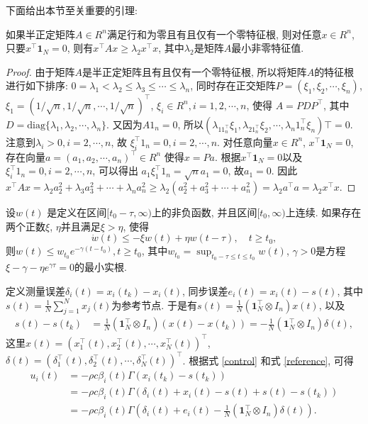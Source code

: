     下面给出本节至关重要的引理:
        \begin{lem}\label{mainlemma}
            如果半正定矩阵$A\in R^n$满足行和为零且有且仅有一个零特征根, 则对任意$x\in  R^n$, 只要$x^\top\mathbf{1}_N=0$, 则有$x^\top A x\geq\lambda_2x^\top x$, 其中$\lambda_2$是矩阵$A$最小非零特征值.
        \end{lem}
        \begin{proof}
        由于矩阵$A$是半正定矩阵且有且仅有一个零特征根, 所以将矩阵$A$的特征根进行如下排序: $0=\lambda_1<\lambda_2\leq\lambda_3\leq\cdots\leq\lambda_n$, 同时存在正交矩阵$P=(\xi_1,\xi_2,\cdots,\xi_n)$, $\xi_1=(1/\sqrt{n},1/\sqrt{n},\cdots,1/\sqrt{n})^\top$, $\xi_i\in R^n, i=1,2,\cdots,n$, 使得
        $A=PDP^\top$, 其中$D=\text{diag}\{\lambda_1,\lambda_2,\cdots,\lambda_n\}$. 又因为$A1_n=0$, 所以$(\lambda_11_n^\top\xi_1,\lambda_21_n^\top\xi_2,\cdots,\lambda_n1_n^\top\xi_n)\top=0$. 注意到$\lambda_i>0, i=2,\cdots,n$, 故 $\xi_i^\top1_n=0, i=2,\cdots,n$. 对任意向量$x\in  R^n$, $x^\top\mathbf{1}_N=0$, 存在向量$a=(a_1,a_2,\cdots,a_n)^\top\in R^n$ 使得$ x=Pa$. 根据$x^\top\mathbf{1}_N=0$以及$\xi_i^\top1_n=0, i=2,\cdots,n$, 可以得出 $a_1\xi_1^\top1_n=\sqrt{n}a_1=0$, 故$a_1=0$. 因此$x^\top A x=\lambda_2a_2^2+\lambda_3a_3^2+\cdots+\lambda_na_n^2\geq\lambda_2(a_2^2+a_3^2+\cdots+a_n^2)=\lambda_2a^\top a=\lambda_2x^\top x$.
        \end{proof}
        \begin{lem}[Halanay不等式]{\rm{}}\label{Halanay}
            设$w(t)$ 是定义在区间$[t_0-\tau, \infty)$上的非负函数, 并且区间$[t_0, \infty)$上连续.
            如果存在两个正数$\xi$, $\eta$并且满足$\xi>\eta$, 使得
            $$\dot{w}(t)\leq -\xi w(t)+\eta w(t-\tau),\quad t\geq t_0,$$
            则$w(t)\leq w_{t_0}e^{-\gamma(t-t_0)}, t\geq t_0$,
            其中$w_{t_0}=\sup_{t_0-\tau\leq t\leq t_0}w(t)$, $\gamma>0$是方程$\xi-\gamma-\eta e^{\gamma\tau}=0$的最小实根.
        \end{lem}
        定义测量误差$\delta_i(t)=x_i(t_k)-x_i(t)$, 同步误差$e_{i}(t)=x_{i}(t)-s(t)$, 其中$s(t)=\frac{1}{N}\sum_{j=1}^Nx_j(t)$为参考节点.
        于是有${s}(t)=\frac{1}{N}(\mathbf{1}^\top_N\otimes I_n)x(t)$, 以及
        \begin{align}\label{reference}
        s(t)-s(t_k)&=\frac{1}{N}(\mathbf{1}^\top_N\otimes I_n)(x(t)-x(t_k))
        =-\frac{1}{N}(\mathbf{1}_N^\top\otimes I_n)\delta(t),
        \end{align}
        这里$x(t)=(x^\top_1(t),x^\top_2(t),\cdots,x^\top_N(t))^\top$, ${\delta}(t)=({\delta}^\top_1(t),{\delta}^\top_2(t),\cdots,{\delta}^\top_N(t))^\top$. 根据式 \eqref{control} 和式 \eqref{reference}, 可得
        \begin{align*}
        {u}_i(t)&=-\rho c\beta_i(t)\Gamma(x_i(t_k)-s(t_k))\\
        &=-\rho c\beta_i(t)\Gamma({\delta}_i(t)+x_i(t)-{s}(t)+{s}(t)-{s}(t_k))\\
        &=-\rho c\beta_i(t)\Gamma({\delta}_i(t)+e_i(t)-\frac{1}{N}(\mathbf{1}_N^\top\otimes I_n)\delta(t)).
        \end{align*}

